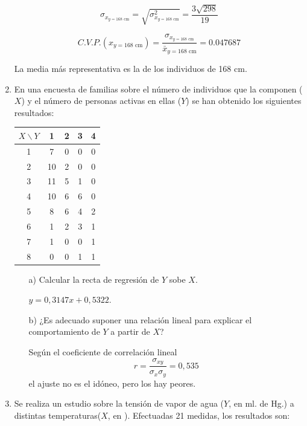 \documentclass[10pt,a4paper]{article}
\begin{document}
\begin{enumerate}
\begin{equation*}
\sigma_{x_{y = 168 \textrm{ cm}}} = \sqrt{\sigma_{x_{y = 168 \textrm{ cm}}}^2} = \dfrac{3 \sqrt{298}}{19}
\end{equation*}

\begin{equation*}
C.V.P.(x_{y = 168 \textrm{ cm}}) = \dfrac{\sigma_{x_{y = 168 \textrm{ cm}}}}{\bar{x}_{y = 168 \textrm{ cm}}} = 0.047687
\end{equation*}

La media más representativa es la de los individuos de 168 cm.
\newpage

\item En una encuesta de familias sobre el número de individuos que la componen ($X$) y el número de personas activas en ellas ($Y$) se han obtenido los siguientes resultados:

\begin{center}
\begin{tabular}{c|cccc}
$X \backslash Y$ & 1 & 2 & 3 & 4 \\\hline
1 & 7 & 0 & 0 & 0 \\
2 & 10 & 2 & 0 & 0 \\
3 & 11 & 5 & 1 & 0 \\
4 & 10 & 6 & 6 & 0 \\
5 & 8 & 6 & 4 & 2 \\
6 & 1 & 2 & 3 & 1 \\
7 & 1 & 0 & 0 & 1 \\
8 & 0 & 0 & 1 & 1 \\
\end{tabular}
\end{center}

\begin{itemize}
\item[a)]Calcular la recta de regresión de $Y$ sobe $X$.

$y=0,3147x + 0,5322$.

\item[b)]¿Es adecuado suponer una relación lineal para explicar el comportamiento de $Y$ a partir de $X$?

Según el coeficiente de correlación lineal $$r = \frac{\sigma_{xy}}{\sigma_x\sigma_y} = 0,535$$ el ajuste no es el idóneo, pero los hay peores.

\end{itemize}

\newpage

		\item Se realiza un estudio sobre la tensión de vapor de agua ($Y$, en ml. de Hg.) a distintas temperaturas($X$, en \textcelsius{}). Efectuadas 21 medidas, los resultados son:


\end{enumerate}
\end{document}
